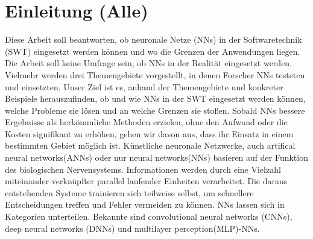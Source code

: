 \section{Einleitung (Alle)}
Diese Arbeit soll beantworten, ob neuronale Netze (NNs) in der Softwaretechnik (SWT) eingesetzt werden können und wo die Grenzen der Anwendungen liegen. Die Arbeit soll keine Umfrage sein, ob NNs in der Realität eingesetzt werden. Vielmehr werden drei Themengebiete vorgestellt, in denen Forscher NNs testeten und einsetzten. Unser Ziel ist es, anhand der Themengebiete und konkreter Beispiele herauszufinden, ob und wie NNs in der SWT eingesetzt werden können, welche Probleme sie lösen und an welche Grenzen sie stoßen. Sobald NNs bessere Ergebnisse als herkömmliche Methoden erzielen, ohne den Aufwand oder die Kosten signifikant zu erhöhen, gehen wir davon aus, dass ihr Einsatz in einem bestimmten Gebiet möglich ist.
Künstliche neuronale Netzwerke, auch artifical neural networks(ANNs) oder nur neural networks(NNs) basieren auf der Funktion des biologischen Nervensystems. Informationen werden durch eine Vielzahl miteinander verknüpfter parallel laufender Einheiten verarbeitet. Die daraus entstehenden Systeme trainieren sich teilweise selbst, um schnellere Entscheidungen treffen und Fehler vermeiden zu können.\cite{technology} 
NNs lassen sich in Kategorien unterteilen. Bekannte sind convolutional neural networks (CNNs), deep neural networks (DNNs) und multilayer perception(MLP)-NNs.
